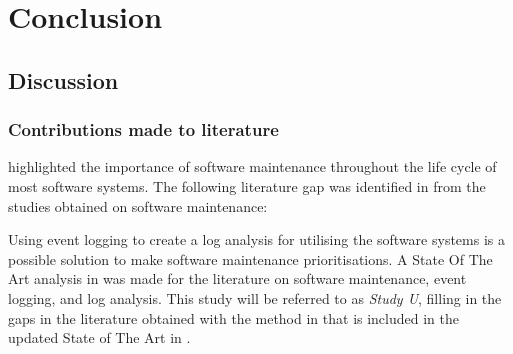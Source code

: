 \chapter{Conclusion}
\label{chap:4}

\section{Discussion}

\subsection{Contributions made to literature}
 highlighted the importance of software maintenance throughout the life cycle of most software systems. The following literature gap was identified in  from the studies obtained on software maintenance: 

\begin{center}
	\begin{tcolorbox}[colback=lightgray, colframe=black, sharp corners=all, arc=4pt]
		\begin{minipage}{\textwidth}
			\RaggedRight\textit{\studyGap}
		\end{minipage}
	\end{tcolorbox}
\end{center}

Using event logging to create a log analysis for utilising the software systems is a possible solution to make software maintenance prioritisations. A State Of The Art analysis in  was made for the literature on software maintenance, event logging, and log analysis. This study will be referred to as \textit{Study U}, filling in the gaps in the literature obtained with the method in  that is included in the updated State of The Art in .

